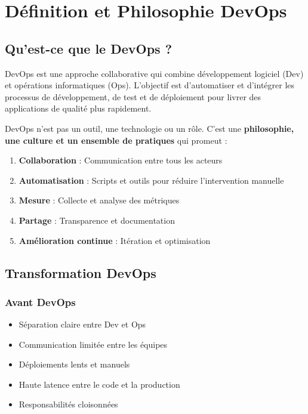 \documentclass[12pt,a4paper]{report}
\begin{document}
\section{Définition et Philosophie DevOps}

\subsection{Qu'est-ce que le DevOps ?}

DevOps est une approche collaborative qui combine développement logiciel (Dev) et opérations informatiques (Ops). L'objectif est d'automatiser et d'intégrer les processus de développement, de test et de déploiement pour livrer des applications de qualité plus rapidement.

DevOps n'est pas un outil, une technologie ou un rôle. C'est une \textbf{philosophie, une culture et un ensemble de pratiques} qui promeut :

\begin{enumerate}
    \item \textbf{Collaboration} : Communication entre tous les acteurs
    \item \textbf{Automatisation} : Scripts et outils pour réduire l'intervention manuelle
    \item \textbf{Mesure} : Collecte et analyse des métriques
    \item \textbf{Partage} : Transparence et documentation
    \item \textbf{Amélioration continue} : Itération et optimisation
\end{enumerate}

\subsection{Transformation DevOps}

\subsubsection{Avant DevOps}

\begin{itemize}
    \item Séparation claire entre Dev et Ops
    \item Communication limitée entre les équipes
    \item Déploiements lents et manuels
    \item Haute latence entre le code et la production
    \item Responsabilités cloisonnées
\end{itemize}
\end{document}

